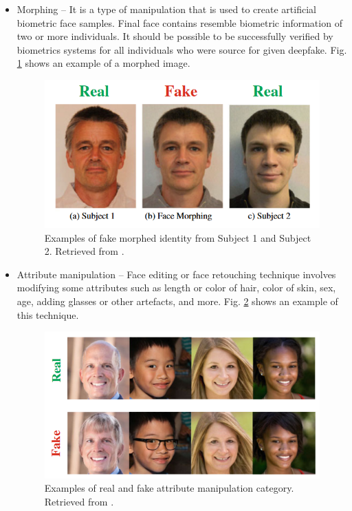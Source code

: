 \begin{itemize}
\item Morphing – It is a type of manipulation that is used to create artificial biometric face samples. Final face contains resemble biometric information of two or more individuals. It should be possible to be successfully verified by biometrics systems for all individuals who were source for given deepfake. Fig. \ref{fig:morphing} shows an example of a morphed image.
\begin{figure}[H]
    \centering
    \includegraphics[width=.45\linewidth]{other-fig/morphing.png}        
    \caption{Examples of fake morphed identity from Subject 1 and Subject 2. Retrieved from \cite{IntroductionToDigitalFaceManipulation}.}
\label{fig:morphing}
\end{figure}

\item Attribute manipulation – Face editing or face retouching technique involves modifying some attributes such as length or color of hair, color of skin, sex, age, adding glasses or other artefacts, and more. Fig. \ref{fig:attribute_manipulation} shows an example of this technique.
\begin{figure}[H]
    \centering
    \includegraphics[width=.55\linewidth]{other-fig/attribute_manipulation.png}        
    \caption{Examples of real and fake attribute manipulation category. Retrieved from \cite{IntroductionToDigitalFaceManipulation}.}
\label{fig:attribute_manipulation}
\end{figure}


\end{itemize}
